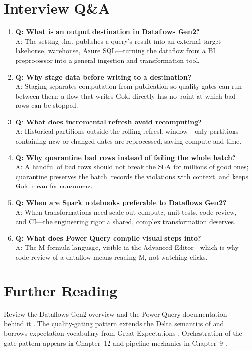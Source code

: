 \section{Interview Q\&A}
\begin{enumerate}
    \item \textbf{Q: What is an output destination in Dataflows Gen2?}\\
    A: The setting that publishes a query's result into an external target---lakehouse, warehouse, Azure SQL---turning the dataflow from a BI preprocessor into a general ingestion and transformation tool.
    \item \textbf{Q: Why stage data before writing to a destination?}\\
    A: Staging separates computation from publication so quality gates can run between them; a flow that writes Gold directly has no point at which bad rows can be stopped.
    \item \textbf{Q: What does incremental refresh avoid recomputing?}\\
    A: Historical partitions outside the rolling refresh window---only partitions containing new or changed dates are reprocessed, saving compute and time.
    \item \textbf{Q: Why quarantine bad rows instead of failing the whole batch?}\\
    A: A handful of bad rows should not break the SLA for millions of good ones; quarantine preserves the batch, records the violations with context, and keeps Gold clean for consumers.
    \item \textbf{Q: When are Spark notebooks preferable to Dataflows Gen2?}\\
    A: When transformations need scale-out compute, unit tests, code review, and CI---the engineering rigor a shared, complex transformation deserves.
    \item \textbf{Q: What does Power Query compile visual steps into?}\\
    A: The M formula language, visible in the Advanced Editor---which is why code review of a dataflow means reading M, not watching clicks.
\end{enumerate}

\section{Further Reading}
Review the Dataflows Gen2 overview \cite{microsoftFabricDataflows} and the Power Query documentation behind it \cite{microsoftPowerQuery}. The quality-gating pattern extends the Delta semantics of \cite{deltaLakeDocs} and borrows expectation vocabulary from Great Expectations \cite{greatExpectations}. Orchestration of the gate pattern appears in Chapter~12 \cite{microsoftFabricMonitoringHub} and pipeline mechanics in Chapter~9 \cite{microsoftFabricPipelines}.

